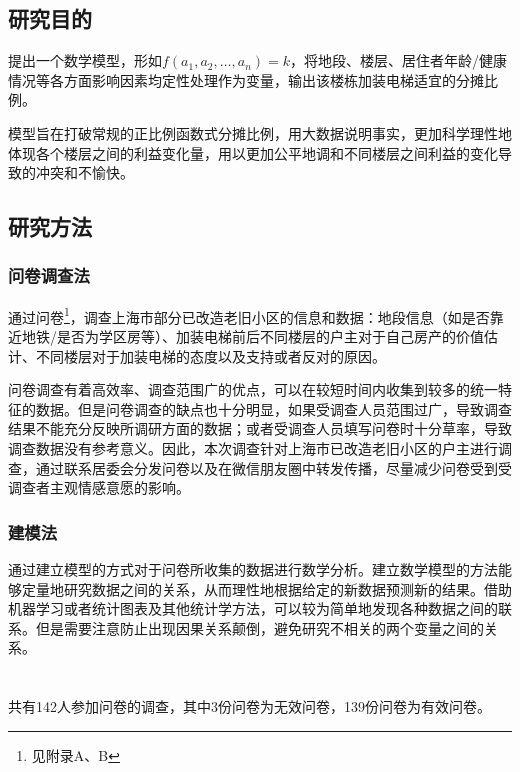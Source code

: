 \documentclass[lang=cn,a4paper]{elegantpaper}
\begin{document}
    \subsection{研究目的}
    提出一个数学模型，形如$f(a_1,a_2,\dots,a_n)=k$，将地段、楼层、居住者年龄/健康情况等各方面影响因素均定性处理作为变量，输出该楼栋加装电梯适宜的分摊比例。

    模型旨在打破常规的正比例函数式分摊比例，用大数据说明事实，更加科学理性地体现各个楼层之间的利益变化量，用以更加公平地调和不同楼层之间利益的变化导致的冲突和不愉快。
    \subsection{研究方法}

    \subsubsection{问卷调查法}
    通过问卷\footnote{见附录A、B}，调查上海市部分已改造老旧小区的信息和数据：地段信息（如是否靠近地铁/是否为学区房等）、加装电梯前后不同楼层的户主对于自己房产的价值估计、不同楼层对于加装电梯的态度以及支持或者反对的原因。

    问卷调查有着高效率、调查范围广的优点，可以在较短时间内收集到较多的统一特征的数据。但是问卷调查的缺点也十分明显，如果受调查人员范围过广，导致调查结果不能充分反映所调研方面的数据；或者受调查人员填写问卷时十分草率，导致调查数据没有参考意义。因此，本次调查针对上海市已改造老旧小区的户主进行调查，通过联系居委会分发问卷以及在微信朋友圈中转发传播，尽量减少问卷受到受调查者主观情感意愿的影响。

    \subsubsection{建模法}
    通过建立模型的方式对于问卷所收集的数据进行数学分析。建立数学模型的方法能够定量地研究数据之间的关系，从而理性地根据给定的新数据预测新的结果。借助机器学习或者统计图表及其他统计学方法，可以较为简单地发现各种数据之间的联系。但是需要注意防止出现因果关系颠倒，避免研究不相关的两个变量之间的关系。

    \section{}
    \subsection{}
    共有142人参加问卷的调查，其中3份问卷为无效问卷，139份问卷为有效问卷。
    
\end{document}
